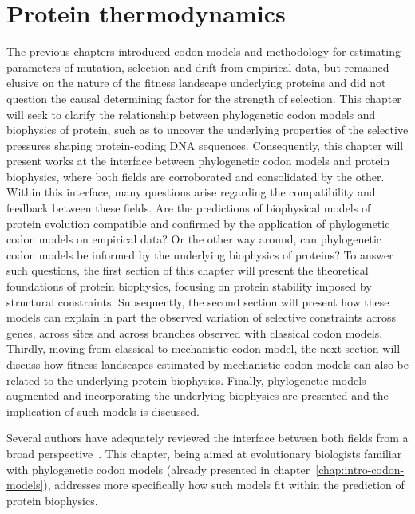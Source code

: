 \chapter{Protein thermodynamics}
{\hypersetup{linkcolor=GREYDARK}\minitoc}
\label{chap:intro-physic-proteins}

The previous chapters introduced codon models and methodology for estimating parameters of mutation, selection and drift from empirical data, but remained elusive on the nature of the fitness landscape underlying proteins and did not question the causal determining factor for the strength of selection.
This chapter will seek to clarify the relationship between phylogenetic codon models and biophysics of protein, such as to uncover the underlying properties of the selective pressures shaping protein-coding \acrshort{DNA} sequences.
Consequently, this chapter will present works at the interface between phylogenetic codon models and protein biophysics, where both fields are corroborated and consolidated by the other.
Within this interface, many questions arise regarding the compatibility and feedback between these fields.
Are the predictions of biophysical models of protein evolution compatible and confirmed by the application of phylogenetic codon models on empirical data?
Or the other way around, can phylogenetic codon models be informed by the underlying biophysics of proteins?
To answer such questions, the first section of this chapter will present the theoretical foundations of protein biophysics, focusing on protein stability imposed by structural constraints.
Subsequently, the second section will present how these models can explain in part the observed variation of selective constraints across genes, across sites and across branches observed with classical codon models.
Thirdly, moving from classical to mechanistic codon model, the next section will discuss how fitness landscapes estimated by mechanistic codon models can also be related to the underlying protein biophysics.
Finally, phylogenetic models augmented and incorporating the underlying biophysics are presented and the implication of such models is discussed.

Several authors have adequately reviewed the interface between both fields from a broad perspective~\citep{Liberles2012,Serohijos2014,Sikosek2014,Arenas2015,Echave2017,Bastolla2017}. This chapter, being aimed at evolutionary biologists familiar with phylogenetic codon models (already presented in chapter~\ref{chap:intro-codon-models}), addresses more specifically how such models fit within the prediction of protein biophysics.

